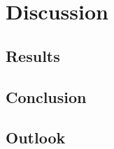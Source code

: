 \chapter{Discussion}\label{chapter:discussion}
\section{Results}
\section{Conclusion}
\section{Outlook}